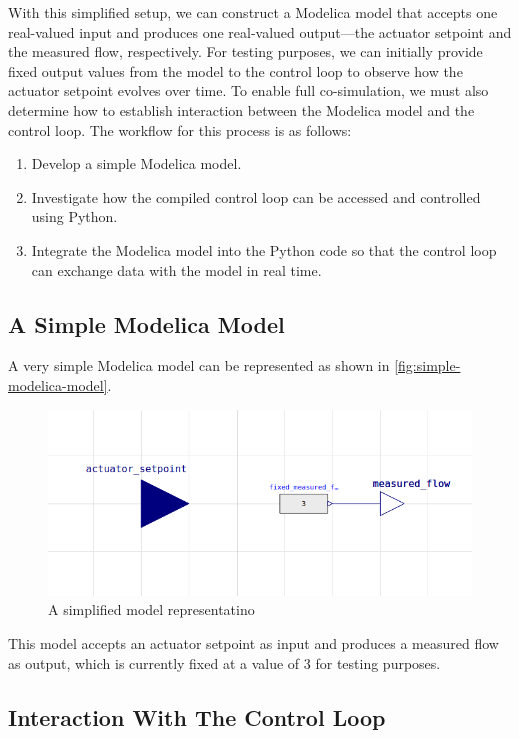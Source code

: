 \documentclass[we,final,11pt,oneside,openany]{uantwerpenbamathesis}
\begin{document}
With this simplified setup, we can construct a Modelica model that accepts one real-valued input and produces one real-valued output—the actuator setpoint and the measured flow, respectively.
For testing purposes, we can initially provide fixed output values from the model to the control loop to observe how the actuator setpoint evolves over time.
To enable full co-simulation, we must also determine how to establish interaction between the Modelica model and the control loop.
The workflow for this process is as follows:
\begin{enumerate}
    \item Develop a simple Modelica model.
    \item Investigate how the compiled control loop can be accessed and controlled using Python.
    \item Integrate the Modelica model into the Python code so that the control loop can exchange data with the model in real time.
\end{enumerate}

\subsection{A Simple Modelica Model}
\label{subsec:a-simple-modelica-model}

A very simple Modelica model can be represented as shown in \autoref{fig:simple-modelica-model}.
\begin{figure}
    \centering
    \includegraphics[width=0.6\linewidth]{Images/modelica/simple-representation}
    \caption{A simplified model representatino}
    \label{fig:simple-modelica-model}
\end{figure}

This model accepts an actuator setpoint as input and produces a measured flow as output, which is currently fixed at a value of 3 for testing purposes.

\subsection{Interaction With The Control Loop}
\label{subsec:interaction-with-the-control-loop}
\end{document}
